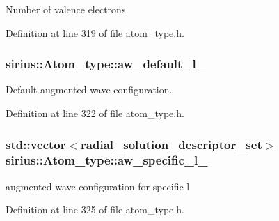 Number of valence electrons. 



Definition at line 319 of file atom\+\_\+type.\+h.

\hypertarget{classsirius_1_1_atom__type_acfb62480282cfbcb162daf39a43683d5}{}
\subsubsection[{aw\+\_\+default\+\_\+l\+\_\+}]{ sirius\+::\+Atom\+\_\+type\+::aw\+\_\+default\+\_\+l\+\_\+\hspace{0.3cm}{\ttfamily [private]}}\label{classsirius_1_1_atom__type_acfb62480282cfbcb162daf39a43683d5}


Default augmented wave configuration. 



Definition at line 322 of file atom\+\_\+type.\+h.

\hypertarget{classsirius_1_1_atom__type_abc7f9502315e24d07ef9b5078e1fa25a}{}
\subsubsection[{aw\+\_\+specific\+\_\+l\+\_\+}]{\setlength{\rightskip}{0pt plus 5cm}std\+::vector$<${\bf radial\+\_\+solution\+\_\+descriptor\+\_\+set}$>$ sirius\+::\+Atom\+\_\+type\+::aw\+\_\+specific\+\_\+l\+\_\+\hspace{0.3cm}{\ttfamily [private]}}\label{classsirius_1_1_atom__type_abc7f9502315e24d07ef9b5078e1fa25a}


augmented wave configuration for specific l 



Definition at line 325 of file atom\+\_\+type.\+h.

\hypertarget{classsirius_1_1_atom__type_a8e525b6cc881daedb13d9a882c190873}{}

